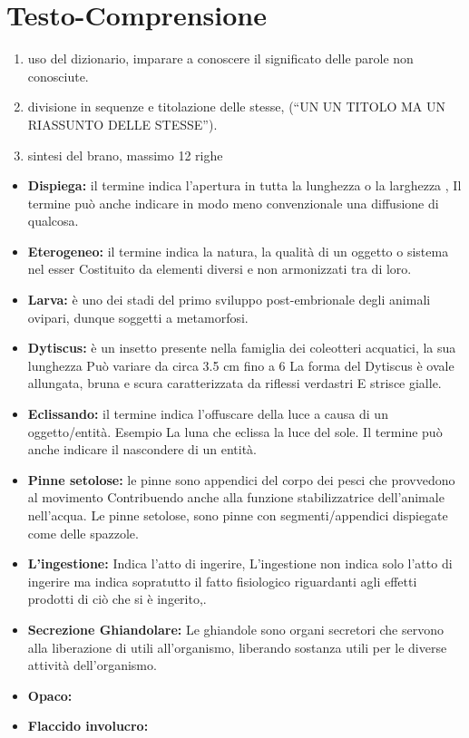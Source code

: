 \documentclass{article}
\begin{document}
\section{Testo-Comprensione}
\begin{enumerate}
  \item uso del dizionario, imparare a conoscere il significato delle parole non conosciute.
  \item divisione in sequenze e titolazione delle stesse, (“UN UN TITOLO MA UN RIASSUNTO DELLE STESSE”).
  \item sintesi del brano, massimo 12 righe
\end{enumerate}
\vspace{2cm}
\begin{itemize}

\item \textbf{Dispiega:} il termine indica l’apertura in tutta la lunghezza o la larghezza ,
Il termine può anche indicare in modo meno convenzionale una diffusione di qualcosa.
\item \textbf{Eterogeneo:} il termine indica la natura, la qualità di un oggetto o sistema nel esser 
Costituito da elementi diversi e non armonizzati tra di loro.
\item \textbf{Larva:} è uno dei stadi del primo sviluppo post-embrionale degli animali ovipari, dunque soggetti a metamorfosi.
\item \textbf{Dytiscus:} è un insetto presente nella famiglia dei coleotteri acquatici, la sua lunghezza
Può variare da circa 3.5 cm  fino a 6
La forma del Dytiscus è ovale allungata, bruna e scura caratterizzata da riflessi verdastri
E strisce gialle.
\item \textbf{Eclissando:}  il termine indica l’offuscare della luce a causa di un oggetto/entità. Esempio 
La luna che eclissa la luce del sole.
Il termine può anche indicare il nascondere di un entità.
\item \textbf{Pinne setolose:} le pinne sono appendici del corpo dei pesci che provvedono al movimento 
Contribuendo anche alla funzione stabilizzatrice dell’animale nell’acqua.
Le pinne setolose, sono pinne con segmenti/appendici dispiegate come delle spazzole.
\item \textbf{L’ingestione:} Indica l’atto di ingerire, L’ingestione non indica solo l’atto di ingerire ma indica sopratutto il fatto fisiologico riguardanti agli effetti prodotti di ciò che si è ingerito,.
\item \textbf{Secrezione Ghiandolare:} Le ghiandole sono organi secretori che servono alla liberazione di utili all’organismo, liberando sostanza utili per le diverse attività dell’organismo.
\item \textbf{Opaco:}
\item \textbf{Flaccido involucro:}

\end{itemize}
\end{document}
